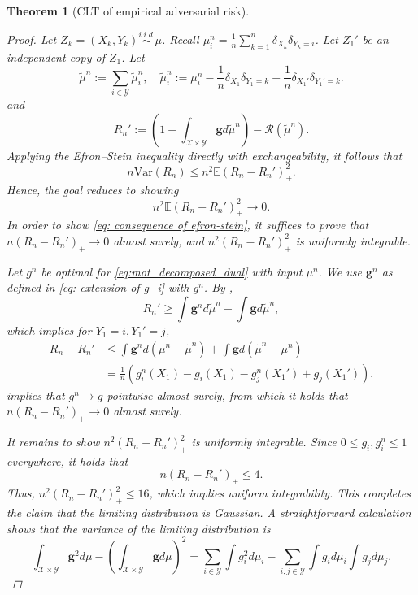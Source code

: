 \documentclass{amsart}
\theoremstyle{plain}
\numberwithin{equation}{section}\newtheorem{theorem}{Theorem}[section]
\theoremstyle{remark}
\begin{document}
\begin{theorem}[CLT of empirical adversarial risk]
\begin{proof}
Let $Z_k=(X_k, Y_k) \overset{i.i.d.}{\sim} \mu$. Recall $\mu_i^n= \frac{1}{n} \sum_{k=1}^{n} \delta_{X_k} \delta_{Y_k=i}$. Let $Z_1'$ be an independent copy of $Z_1$. Let
\[
    \tilde{\mu}^n:= \sum_{i \in \mathcal{Y}} \tilde{\mu}_i^n, \quad \tilde{\mu}_i^n:= \mu_i^n - \frac{1}{n}\delta_{X_1} \delta_{Y_1=k} + \frac{1}{n} \delta_{X_1'} \delta_{Y_1'=k}.
\]
and
\[
    R_n' := \left(1 - \int_{\mathcal{X} \times \mathcal{Y}} \bm{g} d\tilde{\mu}^n \right) - \mathscr{R}(\tilde{\mu}^n).
\]
Applying the Efron–Stein inequality directly with exchangeability, it follows that
\[
    n \text{Var} (R_n) \leq n^2 \mathbb{E} \left( R_n - R_n'\right)_+^2.
\]
Hence, the goal reduces to showing
\begin{equation}\label{eq: consequence of efron-stein}
    n^2 \mathbb{E} \left( R_n - R_n'\right)_+^2 \longrightarrow 0.
\end{equation}
In order to show \eqref{eq: consequence of efron-stein}, it suffices to prove that $n \left(R_n - R_n' \right)_+ \to 0$ almost surely, and $n^2 \left(R_n - R_n' \right)_+^2$ is uniformly integrable.






Let $g^n$ be optimal for \eqref{eq:mot_decomposed_dual} with input $\mu^n$. We use $\bm{g}^n$ as defined in \eqref{eq: extension of g_i} with $g^n$. By ,
\[
    R_n' \geq \int \bm{g}^n d \tilde{\mu}^n  - \int \bm{g} d \tilde{\mu}^n ,
\]
which implies for $Y_1=i, Y_1'=j$,
\begin{align*}
    R_n - R_n' &\leq \int \bm{g}^n d (\mu^n - \tilde{\mu}^n) + \int \bm{g} d( \tilde{\mu}^n - \mu^n)\\
    &=\frac{1}{n} \left( g_i^n(X_1) - g_i(X_1) - g_j^n(X_1') + g_j(X_1') \right).
\end{align*}
 implies that $g^n \to g$ pointwise almost surely, from which it holds that
$n \left(R_n - R_n' \right)_+ \longrightarrow 0$ almost surely.




It remains to show $n^2 \left(R_n - R_n' \right)_+^2$ is uniformly integrable. Since $0 \leq g_i, g_i^n \leq 1$ everywhere, it holds that
\[
    n \left(R_n - R_n' \right)_+ \leq 4.
\]
Thus, $n^2 \left(R_n - R_n' \right)_+^2 \leq 16$, which implies uniform integrability. This completes the claim that the limiting distribution is Gaussian. A straightforward calculation shows that the variance of the limiting distribution is
\[
  \int_{\mathcal{X} \times \mathcal{Y}} \bm{g}^2 d\mu - \left( \int_{\mathcal{X} \times \mathcal{Y}} \bm{g} d\mu \right)^2 = \sum_{i \in \mathcal{Y}} \int g_i^2 d\mu_i - \sum_{i, j \in \mathcal{Y}} \int g_i d\mu_i \int g_j d\mu_j.  
\]
\end{proof}
\end{theorem}    
\end{document}
